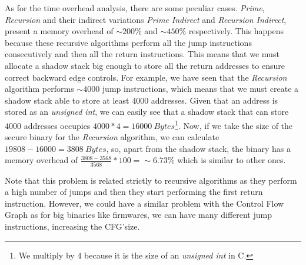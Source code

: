 As for the time overhead analysis, there are some peculiar cases. \textit{Prime},
\textit{Recursion} and their indirect variations \textit{Prime Indirect} and
\textit{Recursion Indirect}, present a memory overhead of $\sim 200\%$ and
$\sim 450\%$ respectively. This happens because these recursive algorithms perform
all the jump instructions consecutively and then all the return instructions.
This means that we must allocate a shadow stack big enough to store all the
return addresses to ensure correct backward edge controls. For example, we have
seen that the \textit{Recursion} algorithm performs $\sim 4000$ jump instructions,
which means that we must create a shadow stack able to store at least $4000$
addresses. Given that an address is stored as an \textit{unsigned int}, we can easily
see that a shadow stack that can store $4000$ addresses occupies $4000*4 = 16000
\ \textit{Bytes}$\footnote{We multiply by $4$ because it is the size of an
\textit{unsigned int} in C.}. Now, if we take the size of the secure binary for
the \textit{Recursion} algorithm, we can calculate
$19808 - 16000 = 3808 \ \textit{Bytes}$, so, apart from the shadow stack, the binary
has a memory overhead of $\frac{3808-3568}{3568}*100 = \sim 6. 73\%$ which is similar
to other ones.

Note that this problem is related strictly to recursive algorithms as they perform
a high number of jumps and then they start performing the first return instruction.
However, we could have a similar problem with the Control Flow Graph as for big binaries
like firmwares, we can have many different jump instructions, increasing the CFG'size.

